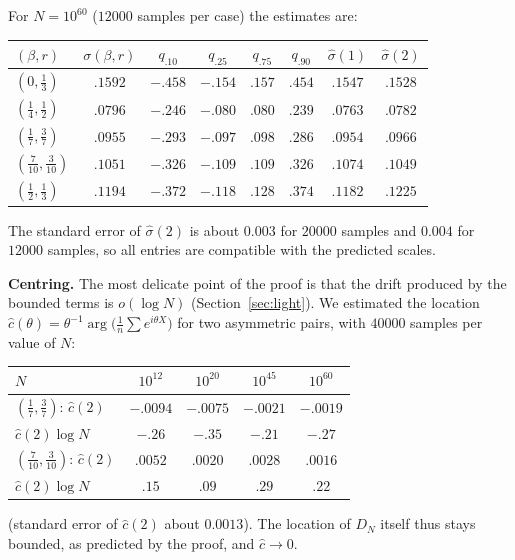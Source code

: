\documentclass[11pt]{amsart}
\theoremstyle{definition}
\numberwithin{equation}{section}
\begin{document}
For $N=10^{60}$ ($12000$ samples per case) the estimates are:
\begin{center}\small
\begin{tabular}{lccccccc}\toprule
$(\beta,r)$ & $\sigma(\beta,r)$ & $q_{.10}$ & $q_{.25}$ & $q_{.75}$ & $q_{.90}$ & $\hat\sigma(1)$ & $\hat\sigma(2)$\\\midrule
$(0,\frac13)$ & $.1592$ & $-.458$ & $-.154$ & $.157$ & $.454$ & $.1547$ & $.1528$\\
$(\frac14,\frac12)$ & $.0796$ & $-.246$ & $-.080$ & $.080$ & $.239$ & $.0763$ & $.0782$\\
$(\frac17,\frac37)$ & $.0955$ & $-.293$ & $-.097$ & $.098$ & $.286$ & $.0954$ & $.0966$\\
$(\frac7{10},\frac3{10})$ & $.1051$ & $-.326$ & $-.109$ & $.109$ & $.326$ & $.1074$ & $.1049$\\
$(\frac12,\frac13)$ & $.1194$ & $-.372$ & $-.118$ & $.128$ & $.374$ & $.1182$ & $.1225$\\\bottomrule
\end{tabular}
\end{center}
The standard error of $\hat\sigma(2)$ is about $0.003$ for $20000$ samples and $0.004$ for $12000$ samples, so all entries are compatible with the
predicted scales.

\smallskip\noindent\textbf{Centring.} The most delicate point of the proof is that the drift produced by the bounded terms is $o(\log N)$
(Section~\ref{sec:light}). We estimated the location $\hat c(\theta)=\theta^{-1}\arg\big(\frac1n\sum e^{i\theta X}\big)$ for two asymmetric pairs,
with $40000$ samples per value of $N$:
\begin{center}\small
\begin{tabular}{lcccc}\toprule
$N$ & $10^{12}$ & $10^{20}$ & $10^{45}$ & $10^{60}$\\\midrule
$(\frac17,\frac37)$: $\hat c(2)$ & $-.0094$ & $-.0075$ & $-.0021$ & $-.0019$\\
\phantom{$(\frac17,\frac37)$:} $\hat c(2)\log N$ & $-.26$ & $-.35$ & $-.21$ & $-.27$\\
$(\frac7{10},\frac3{10})$: $\hat c(2)$ & $.0052$ & $.0020$ & $.0028$ & $.0016$\\
\phantom{$(\frac7{10},\frac3{10})$:} $\hat c(2)\log N$ & $.15$ & $.09$ & $.29$ & $.22$\\\bottomrule
\end{tabular}
\end{center}
(standard error of $\hat c(2)$ about $0.0013$). The location of $D_N$ itself thus stays bounded, as predicted by the proof, and $\hat c\to0$.
\end{document}

